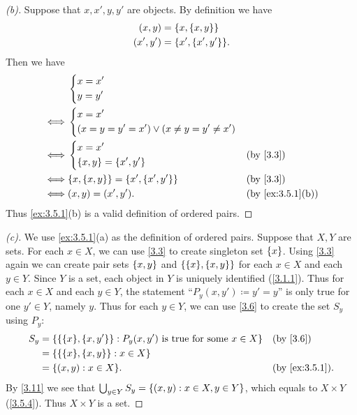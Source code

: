 \begin{proof}[(b)]
	Suppose that \(x, x', y, y'\) are objects.
	By definition we have
	\begin{align*}
		(x, y)   & = \set{x, \set{x, y}}     \\
		(x', y') & = \set{x', \set{x', y'}}.
	\end{align*}
	Then we have
	\begin{align*}
		     & \begin{dcases}
			       x = x' \\
			       y = y'
		       \end{dcases}                                                              \\
		\iff & \begin{dcases}
			       x = x' \\
			       \pa{x = y = y' = x'} \lor \pa{x \neq y = y' \neq x'}
		       \end{dcases}                        \\
		\iff & \begin{dcases}
			       x = x' \\
			       \set{x, y} = \set{x', y'}
		       \end{dcases}                            &  & \by{3.3}                      \\
		\iff & \set{x, \set{x, y}} = \set{x', \set{x', y'}}         &  & \by{3.3}         \\
		\iff & (x, y) = (x', y').                                   &  & \by{ex:3.5.1}[b]
	\end{align*}
	Thus \cref{ex:3.5.1}(b) is a valid definition of ordered pairs.
\end{proof}

\begin{proof}[(c)]
	We use \cref{ex:3.5.1}(a) as the definition of ordered pairs.
	Suppose that \(X, Y\) are sets.
	For each \(x \in X\), we can use \cref{3.3} to create singleton set \(\left\lbrace x\right\rbrace\).
	Using \cref{3.3} again we can create pair sets \(\left\lbrace x, y\right\rbrace\) and \(\set{\set{x}, \set{x, y}}\) for each \(x \in X\) and each \(y \in Y\).
	Since \(Y\) is a set, each object in \(Y\) is uniquely identified (\cref{3.1.1}).
	Thus for each \(x \in X\) and each \(y \in Y\), the statement ``\(P_y(x, y') \coloneqq y' = y\)'' is only true for one \(y' \in Y\), namely \(y\).
	Thus for each \(y \in Y\), we can use \cref{3.6} to create the set \(S_y\) using \(P_y\):
	\begin{align*}
		S_y & = \set{\set{\set{x}, \set{x, y'}} : P_y(x, y') \text{ is true for some } x \in X} &  & \by{3.6}       \\
		    & = \set{\set{\set{x}, \set{x, y}} : x \in X}                                                           \\
		    & = \set{(x, y) : x \in X}.                                                         &  & \by{ex:3.5.1}.
	\end{align*}
	By \cref{3.11} we see that \(\bigcup_{y \in Y} S_y = \left\lbrace(x, y) : x \in X, y \in Y\right\rbrace\), which equals to \(X \times Y\) (\cref{3.5.4}).
	Thus \(X \times Y\) is a set.
\end{proof}

